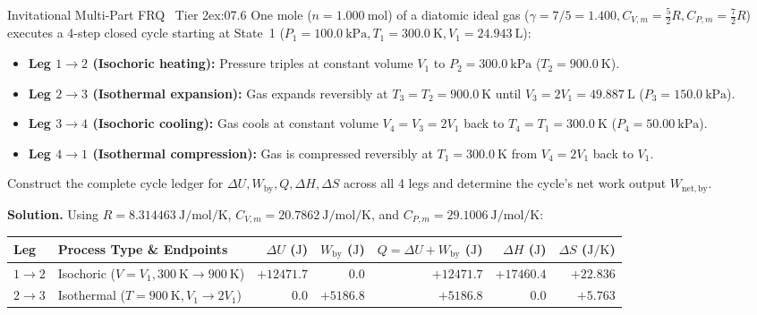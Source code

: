 \begin{workedexample}{Invitational Multi-Part FRQ \textbar\ Tier 2}{ex:07.6}
One mole ($n = \SI{1.000}{\mole}$) of a diatomic ideal gas ($\gamma = 7/5 = 1.400, C_{V,m} = \frac{5}{2}R, C_{P,m} = \frac{7}{2}R$) executes a 4-step closed cycle starting at State~1 ($P_1 = \SI{100.0}{\kilo\pascal}, T_1 = \SI{300.0}{\kelvin}, V_1 = \SI{24.943}{\liter}$):
\begin{itemize}
  \item \textbf{Leg $1\to 2$ (Isochoric heating):} Pressure triples at constant volume $V_1$ to $P_2 = \SI{300.0}{\kilo\pascal}$ ($T_2 = \SI{900.0}{\kelvin}$).
  \item \textbf{Leg $2\to 3$ (Isothermal expansion):} Gas expands reversibly at $T_3 = T_2 = \SI{900.0}{\kelvin}$ until $V_3 = 2V_1 = \SI{49.887}{\liter}$ ($P_3 = \SI{150.0}{\kilo\pascal}$).
  \item \textbf{Leg $3\to 4$ (Isochoric cooling):} Gas cools at constant volume $V_4 = V_3 = 2V_1$ back to $T_4 = T_1 = \SI{300.0}{\kelvin}$ ($P_4 = \SI{50.00}{\kilo\pascal}$).
  \item \textbf{Leg $4\to 1$ (Isothermal compression):} Gas is compressed reversibly at $T_1 = \SI{300.0}{\kelvin}$ from $V_4 = 2V_1$ back to $V_1$.
\end{itemize}
Construct the complete cycle ledger for $\Delta U, W_{\mathrm{by}}, Q, \Delta H, \Delta S$ across all 4 legs and determine the cycle's net work output $W_{\mathrm{net,by}}$.
\par\smallskip\noindent
\textbf{Solution.} Using $R = \SI{8.314463}{\joule\per\mole\per\kelvin}$, $C_{V,m} = \SI{20.7862}{\joule\per\mole\per\kelvin}$, and $C_{P,m} = \SI{29.1006}{\joule\per\mole\per\kelvin}$:
\par\smallskip\noindent
\footnotesize\setlength{\tabcolsep}{4.5pt}\renewcommand{\arraystretch}{1.12}
\begin{tabularx}{\linewidth}{@{}l l r r r r r@{}}
\toprule
\textbf{Leg} & \textbf{Process Type \& Endpoints} & $\Delta U$ ($\si{\joule}$) & $W_{\mathrm{by}}$ ($\si{\joule}$) & $Q = \Delta U + W_{\mathrm{by}}$ ($\si{\joule}$) & $\Delta H$ ($\si{\joule}$) & $\Delta S$ ($\si{\joule\per\kelvin}$) \\
\midrule
$1\to 2$ & Isochoric ($V=V_1, \SI{300}{\kelvin}\to\SI{900}{\kelvin}$) & $+12471.7$ & $0.0$ & $+12471.7$ & $+17460.4$ & $+22.836$ \\
$2\to 3$ & Isothermal ($T=\SI{900}{\kelvin}, V_1\to 2V_1$) & $0.0$ & $+5186.8$ & $+5186.8$ & $0.0$ & $+5.763$ \\

\end{tabularx}
\end{workedexample}
